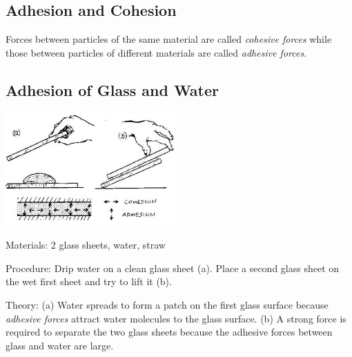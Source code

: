 \begin{multicols}{2}
\columnbreak


\section*{Adhesion and Cohesion}  
Forces between particles of the same material are called \emph{cohesive forces} while those between particles of different materials are called \emph{adhesive forces}.


\subsection{Adhesion of Glass and Water}

\begin{center}
\includegraphics[width=0.49\textwidth]{./img/source/adhesion-cohesion.jpg}
\end{center}

\begin{description*}
\item[Materials:]{2 glass sheets, water, straw}
\item[Procedure:]{Drip water on a clean glass sheet (a). Place a second glass sheet on the wet first sheet and try to lift it (b).}
\item[Theory:]{(a) Water spreads to form a patch on the first glass surface because \emph{adhesive forces}
attract water molecules to the glass surface.
(b) A strong force is required to separate the two glass sheets because the adhesive forces
between glass and water are large.}
\end{description*}


\end{multicols}
